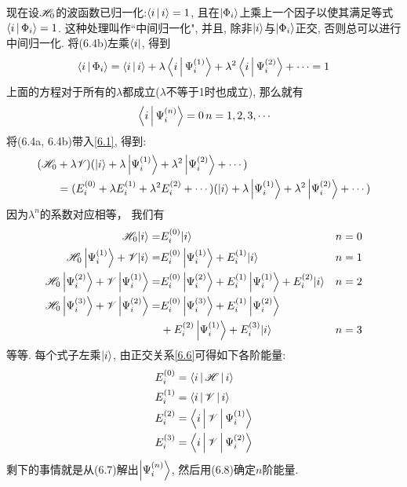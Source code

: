 现在设$\mathscr{H}_0$的波函数已归一化:$\Braket{i|i}=1$, 
且在$\Ket{\Phi_i}$上乘上一个因子以使其满足等式$\Braket{i|\Phi_i}=1$. 
这种处理叫作``中间归一化", 
并且, 
除非$\Ket{i}$与$\Ket{\Phi_i}$正交, 
否则总可以进行中间归一化. 
将(6.4b)左乘$\Bra{i}$, 
得到
\begin{align}
\Braket{i|\Phi_i}=\Braket{i|i}+\lambda\Braket{i|\Psi_i^{(1)}}+\lambda^2\Braket{i|\Psi_i^{(2)}} + \cdots = 1
\end{align}
上面的方程对于所有的$\lambda$都成立($\lambda$不等于1时也成立), 
那么就有
\begin{align}
\braket{i|\Psi_i^{(n)}} = 0\, \hfill n=1,2,3,\cdots
\label{6.6}
\end{align}
将(6.4a,
6.4b)带入\ref{6.1}, 
得到:
\begin{align*}
(\mathscr{H}_0&+\lambda\mathscr{V})(\Ket{i}+\lambda\Ket{\Psi_i^{(1)}} + \lambda^2 \Ket{\Psi_i^{(2)}} +\cdots )\\
&=(E_i^{(0)} + \lambda E_i^{(1)} + \lambda^2 E_i^{(2)}  + \cdots )(\Ket{i}+\lambda\Ket{\Psi_i^{(1)}} + \lambda^2 \Ket{\Psi_i^{(2)}} +\cdots)
\end{align*}
因为$\lambda^n$的系数对应相等，
我们有
\begin{subequations}
	\begin{align}
		\mathscr{H}_0|i\rangle=& E_i^{(0)}|i\rangle & & n=0 \\
		\mathscr{H}_0\left|\Psi_i^{(1)}\right\rangle+\mathscr{V}|i\rangle=& E_i^{(0)}\left|\Psi_i^{(1)}\right\rangle+E_i^{(1)}|i\rangle & & n=1 \\
		\mathscr{H}_0\left|\Psi_i^{(2)}\right\rangle+\mathscr{V}\left|\Psi_i^{(1)}\right\rangle=& E_i^{(0)}\left|\Psi_i^{(2)}\right\rangle+E_i^{(1)}\left|\Psi_i^{(1)}\right\rangle+E_i^{(2)}|i\rangle & & n=2 \\
		\mathscr{H}_0\left|\Psi_i^{(3)}\right\rangle+\mathscr{V}\left|\Psi_i^{(2)}\right\rangle=& E_i^{(0)}\left|\Psi_i^{(3)}\right\rangle+E_i^{(1)}\left|\Psi_i^{(2)}\right\rangle & \notag \\
		&+E_i^{(2)}\left|\Psi_i^{(1)}\right\rangle+E_i^{(3)}|i\rangle & & n=3
	\end{align}
\end{subequations}
等等. 
每个式子左乘$\Ket{i}$, 
由正交关系\ref{6.6}可得如下各阶能量:
\begin{subequations}
\begin{align}
E_i^{(0)} &= \Braket{i|\mathscr{H}|i} \\
E_i^{(1)} &= \Braket{i|\mathscr{V}|i} \\
E_i^{(2)} &= \Braket{i|\mathscr{V}|\Psi_i^{(1)}} \\
E_i^{(3)} &= \Braket{i|\mathscr{V}|\Psi_i^{(2)}}
\end{align}
\end{subequations}
剩下的事情就是从(6.7)解出$\Ket{\Psi_i^{(n)}}$, 
然后用(6.8)确定$n$阶能量.


